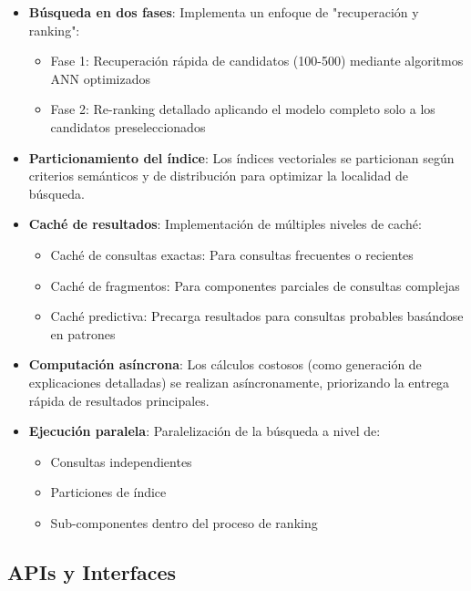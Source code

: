 \documentclass[12pt,a4paper]{article}
\begin{document}
\begin{itemize}
    \item \textbf{Búsqueda en dos fases}: Implementa un enfoque de "recuperación y ranking":
    \begin{itemize}
        \item Fase 1: Recuperación rápida de candidatos (100-500) mediante algoritmos ANN optimizados
        \item Fase 2: Re-ranking detallado aplicando el modelo completo solo a los candidatos preseleccionados
    \end{itemize}
    
    \item \textbf{Particionamiento del índice}: Los índices vectoriales se particionan según criterios semánticos y de distribución para optimizar la localidad de búsqueda.
    
    \item \textbf{Caché de resultados}: Implementación de múltiples niveles de caché:
    \begin{itemize}
        \item Caché de consultas exactas: Para consultas frecuentes o recientes
        \item Caché de fragmentos: Para componentes parciales de consultas complejas
        \item Caché predictiva: Precarga resultados para consultas probables basándose en patrones
    \end{itemize}
    
    \item \textbf{Computación asíncrona}: Los cálculos costosos (como generación de explicaciones detalladas) se realizan asíncronamente, priorizando la entrega rápida de resultados principales.
    
    \item \textbf{Ejecución paralela}: Paralelización de la búsqueda a nivel de:
    \begin{itemize}
        \item Consultas independientes
        \item Particiones de índice
        \item Sub-componentes dentro del proceso de ranking
    \end{itemize}
\end{itemize}

\subsection{APIs y Interfaces}
\label{subsec:ss-apis}
\end{document}
